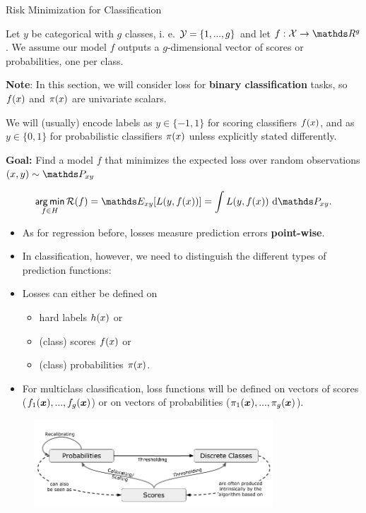 \begin{vbframe}{Risk Minimization for Classification}

Let $y$ be categorical with $g$ classes, i. e.  $\mathcal{Y} = \{1, ..., g\}$ and let $f: \Xspace \to \R^g$. We assume our model $f$ outputs a $g$-dimensional vector of scores or probabilities, one per class.

\lz 

\textbf{Note}: In this section, we will consider loss for \textbf{binary classification} tasks, so $f(x)$ and $\pi(x)$ are univariate scalars.

\lz 

  We will (usually) encode labels as $y \in \{-1, 1\}$ for scoring classifiers $f(x)$, and as $y \in \{0, 1\}$ for probabilistic classifiers $\pi(x)$ unless explicitly stated differently. 


\lz

\textbf{Goal:} Find a model $f$ that minimizes the expected loss over random observations $\xy \sim \Pxy$ 

$$
\argmin_{f \in \Hspace} \riskf = \E_{xy}[\Lxy] = \int \Lxy ~ \text{d}\Pxy. 
$$


\begin{itemize}
  \item As for regression before, losses measure prediction errors \textbf{point-wise}.
  \item In classification, however, we need to distinguish the different types of prediction functions:
  \item Losses can either be defined on
  \begin{itemize}
    \item hard labels $h(x)$ or
    \item (class) scores $f(x)$ or
    \item (class) probabilities $\pi(x)$. 
  \end{itemize}
  \item For multiclass classification, loss functions will be defined on vectors of scores ($f_1(\bm{x}), ..., f_g(\bm{x})$) or on vectors of probabilities ($\pi_1(\bm{x}), ..., \pi_g(\bm{x})$).
\end{itemize}


\framebreak 

\begin{figure}
  \includegraphics[width=0.8\textwidth]{figure_man/classifiers.png}
\end{figure}


\end{vbframe}
